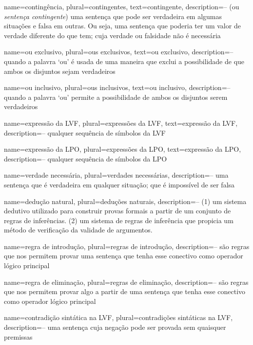 {
 name=contingência,
 plural=contingentes,
 text=contingente,
 description={-- (ou \textit{sentença contingente}) uma sentença que pode ser verdadeira em algumas situações e falsa em outras. Ou seja, uma sentença que poderia ter um valor de verdade diferente do que tem; cuja verdade ou falsidade não é necessária}
}

{
 name=ou exclusivo,
 plural=ous exclusivos,
 text=ou exclusivo,
 description={-- quando a palavra `ou' é usada de uma maneira que exclui a
possibilidade de que ambos os disjuntos sejam verdadeiros}
}

{
 name=ou inclusivo,
 plural=ous inclusivos,
 text=ou inclusivo,
 description={-- quando a palavra `ou' permite a possibilidade de ambos os disjuntos
serem verdadeiros}
}

{
 name=expressão da LVF,
 plural=expressões da LVF,
 text=expressão da LVF,
 description={-- qualquer sequência de símbolos da LVF}
}

{
 name=expressão da LPO,
 plural=expressões da LPO,
 text=expressão da LPO,
 description={-- qualquer sequência de símbolos da LPO}
}

{
 name={verdade necessária},
 plural={verdades necessárias},
 description={-- uma sentença que é verdadeira em qualquer situação; que é impossível de ser falsa}
}

{
 name={dedução natural},
 plural={deduções naturais},
 description={-- (1) um sistema dedutivo utilizado para construir provas formais a partir de um conjunto de regras de inferências. (2) um sistema de regras de inferência que propicia um método de verificação da validade de argumentos.}
}

{
 name={regra de introdução},
 plural={regras de introdução},
 description={-- são regras que nos permitem provar uma sentença que tenha esse conectivo como operador lógico principal}
}

{
 name={regra de eliminação},
 plural={regras de eliminação},
 description={-- são regras que nos permitem provar algo a partir de uma
sentença que tenha esse conectivo como operador lógico principal}
}

{
 name={contradição sintática na LVF},
 plural={contradições sintáticas na LVF},
 description={-- uma sentença cuja negação pode ser provada sem quaisquer premissas}
}

